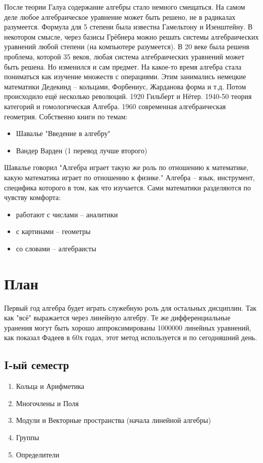 \documentclass{book}
\begin{document}
После теории Галуа содержание алгебры стало немного смещаться. На самом деле
любое алгебраическое уравнение может быть решено, не в радикалах разумеется.
Формула для 5 степени была известна Гамельтону и Изенштейну. В некотором
смысле, через базисы Грёбнера можно решать системы алгебраических уравнений
любой степени (на компьютере разумеется). В 20 веке была решенв проблема,
которой 35 веков, любая система алгебраических уравнений может быть решена.
Но изменился и сам предмет. На какое-то время алгебра стала пониматься как
изучение множеств с операциями. Этим занимались немецкие математики Дедекинд
– кольцами, Форбениус, Жарданова форма и т.д. Потом происходило ещё несколько
революций. 1920 Гильберт и Нётер. 1940-50 теория категорий и гомологическая
Алгебра. 1960 современная алгебраическая геометрия. Собственно книги по темам:
\begin{itemize}
    \item Шавалье "Введение в алгебру"
    \item Вандер Варден (1 перевод лучше второго)
\end{itemize}
Шавалье говорил "Алгебра играет такую же роль по отношению к математике,
какую математика играет по отношению к физике." Алгебра – язык, инструмент,
специфика которого в том, как что изучается. Сами математики разделяются по
чувству комфорта:
\begin{itemize}
    \item работают с числами – аналитики
    \item с картинами – геометры
    \item со словами – алгебраисты
\end{itemize}
\section{План}
Первый год алгебра будет играть служебную роль для остальных дисциплин. Так
как "всё" выражается через линейную алгебру. Те же дифференциальные уранения
могут быть хорошо аппроксимированы 1000000 линейных уравнений, как показал
Фадеев в 60х годах, этот метод используется и по сегодняшний день.
\subsection{I-ый семестр}
\begin{enumerate}
    \item Кольца и Арифметика
    \item Многочлены и Поля
    \item Модули и Векторные пространства (начала линейной алгебры)
    \item Группы
    \item Определители
\end{enumerate}
\end{document}
